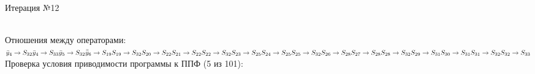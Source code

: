 \documentclass[a4paper,14pt]{article}
\begin{document}
\newpage \\ 
\begin{center}\huge Итерация №12 \end{center}\\
Отношения между операторами: \\ \newline
\begin{math}
    \bar{y}_{4} \rightarrow S_{32} \\ 
\bar{y}_{4} \rightarrow S_{33} \\ 
\bar{y}_{5} \rightarrow S_{32} \\ 
\bar{\bar{y}}_{6} \rightarrow S_{19} \\ 
S_{19} \rightarrow S_{32} \\ 
S_{20} \rightarrow S_{22} \\ 
S_{21} \rightarrow S_{22} \\ 
S_{22} \rightarrow S_{32} \\ 
S_{23} \rightarrow S_{25} \\ 
S_{24} \rightarrow S_{25} \\ 
S_{25} \rightarrow S_{32} \\ 
S_{26} \rightarrow S_{28} \\ 
S_{27} \rightarrow S_{28} \\ 
S_{28} \rightarrow S_{32} \\ 
S_{29} \rightarrow S_{31} \\ 
S_{30} \rightarrow S_{31} \\ 
S_{31} \rightarrow S_{32} \\ 
S_{32} \rightarrow S_{33}
\end{math}\\ \newline
%
Проверка условия приводимости программы к ППФ (5 из 101): \\
\end{document}
